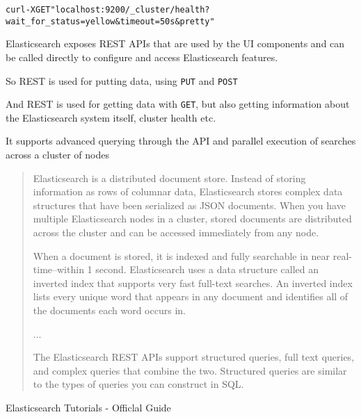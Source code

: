 \documentclass[Screen16to9,17pt]{foils}
\begin{document}

\begin{alltt}
curl -X GET "localhost:9200/_cluster/health?wait_for_status=yellow&timeout=50s&pretty"
\end{alltt}

\begin{list2}
\item Elasticsearch exposes REST APIs that are used by the UI components and can be called directly to configure and access Elasticsearch features.
\item {}
\item So REST is used for putting data, using \verb+PUT+ and \verb+POST+
\item And REST is used for getting data with \verb+GET+, but also getting information about the Elasticsearch system itself, cluster health etc.
\item It supports advanced querying through the API and parallel execution of searches across a cluster of nodes
\end{list2}





\begin{quote}
Elasticsearch is a distributed document store. Instead of storing information as rows of columnar data, Elasticsearch stores complex data structures that have been serialized as JSON documents. When you have multiple Elasticsearch nodes in a cluster, stored documents are distributed across the cluster and can be accessed immediately from any node.

When a document is stored, it is indexed and fully searchable in near real-time--within 1 second. Elasticsearch uses a data structure called an inverted index that supports very fast full-text searches. An inverted index lists every unique word that appears in any document and identifies all of the documents each word occurs in.

...

The Elasticsearch REST APIs support structured queries, full text queries, and complex queries that combine the two. Structured queries are similar to the types of queries you can construct in SQL. \end{quote}

\begin{list2}
\item {}
\item Elasticsearch Tutorials - Officlal Guide 
\end{list2}
\end{document}
